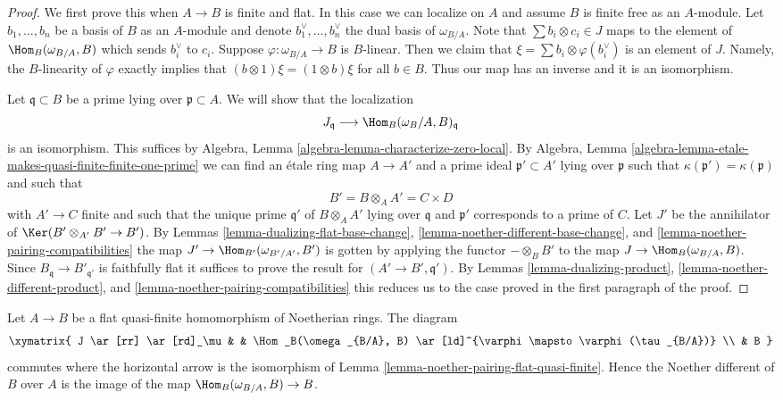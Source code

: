 \begin{proof}
We first prove this when $A \to B$ is finite and flat. In this case we can
localize on $A$ and assume $B$ is finite free as an $A$-module. Let
$b_1, \ldots, b_n$ be a basis of $B$ as an $A$-module and denote
$b_1^\vee, \ldots, b_n^\vee$ the dual basis of $\omega_{B/A}$. Note that
$\sum b_i \otimes c_i \in J$ maps to the element of $\Hom_B(\omega_{B/A}, B)$
which sends $b_i^\vee$ to $c_i$. Suppose $\varphi : \omega_{B/A} \to B$
is $B$-linear. Then we claim that $\xi = \sum b_i \otimes \varphi(b_i^\vee)$
is an element of $J$. Namely, the $B$-linearity of $\varphi$
exactly implies that $(b \otimes 1)\xi = (1 \otimes b)\xi$ for all $b \in B$.
Thus our map has an inverse and it is an isomorphism.

\medskip\noindent
Let $\mathfrak q \subset B$ be a prime lying over $\mathfrak p \subset A$.
We will show that the localization
$$
J_\mathfrak q
\longrightarrow
\Hom_B(\omega_B/A, B)_\mathfrak q
$$
is an isomorphism.
This suffices by Algebra, Lemma \ref{algebra-lemma-characterize-zero-local}.
By
Algebra, Lemma \ref{algebra-lemma-etale-makes-quasi-finite-finite-one-prime}
we can find an \'etale ring map $A \to A'$ and a prime
ideal $\mathfrak p' \subset A'$ lying over $\mathfrak p$
such that $\kappa(\mathfrak p') = \kappa(\mathfrak p)$ and
such that
$$
B' = B \otimes_A A' = C \times D
$$
with $A' \to C$ finite and such that the unique prime $\mathfrak q'$
of $B \otimes_A A'$ lying over $\mathfrak q$ and $\mathfrak p'$
corresponds to a prime of $C$. Let $J'$ be the annihilator of
$\Ker(B' \otimes_{A'} B' \to B')$. By
Lemmas \ref{lemma-dualizing-flat-base-change},
\ref{lemma-noether-different-base-change}, and
\ref{lemma-noether-pairing-compatibilities}
the map $J' \to \Hom_{B'}(\omega_{B'/A'}, B')$
is gotten by applying the functor $- \otimes_B B'$
to the map $J \to \Hom_B(\omega_{B/A}, B)$.
Since $B_\mathfrak q \to B'_{\mathfrak q'}$ is faithfully flat
it suffices to prove the result for $(A' \to B', \mathfrak q')$.
By Lemmas \ref{lemma-dualizing-product},
\ref{lemma-noether-different-product}, and
\ref{lemma-noether-pairing-compatibilities}
this reduces us to the case proved in the first
paragraph of the proof.
\end{proof}

\begin{lemma}
\label{lemma-noether-different-flat-quasi-finite}
Let $A \to B$ be a flat quasi-finite homomorphism of Noetherian rings.
The diagram
$$
\xymatrix{
J \ar[rr] \ar[rd]_\mu & &
\Hom_B(\omega_{B/A}, B) \ar[ld]^{\varphi \mapsto \varphi(\tau_{B/A})} \\
& B
}
$$
commutes where the horizontal arrow is the isomorphism of
Lemma \ref{lemma-noether-pairing-flat-quasi-finite}.
Hence the Noether different of $B$ over $A$
is the image of the map $\Hom_B(\omega_{B/A}, B) \to B$.
\end{lemma}

